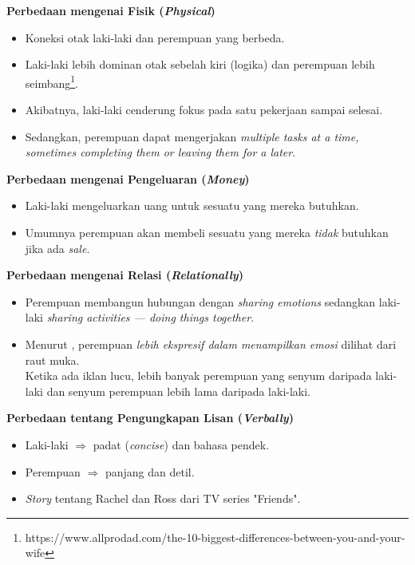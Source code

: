\documentclass{beamer}
\theoremstyle{mystyle}
\begin{document}
\begin{frame}{\textbf{Perbedaan mengenai Fisik (\textit{Physical})}}
	\begin{itemize}
		\item<2-> Koneksi otak laki-laki dan perempuan yang berbeda.
		\hfill \break
		\item<3-> Laki-laki lebih dominan otak sebelah kiri (logika) dan perempuan lebih seimbang\footnote{https://www.allprodad.com/the-10-biggest-differences-between-you-and-your-wife}.
		\hfill \break
		\item<4-> Akibatnya, laki-laki cenderung fokus pada satu pekerjaan sampai selesai.
		\hfill \break		
		\item<5-> Sedangkan, perempuan dapat mengerjakan \textit{multiple tasks at a time, sometimes completing them or leaving them for a later}.\\
		\hfill \break
	\end{itemize}
\end{frame}

\begin{frame}{\textbf{Perbedaan mengenai Pengeluaran (\textit{Money})}}
	\begin{itemize}
		\item Laki-laki mengeluarkan uang untuk sesuatu yang mereka butuhkan.
		\hfill \break
		\item<2-> Umumnya perempuan akan membeli sesuatu yang mereka \textit{tidak} butuhkan jika ada \textit{sale}.
	\end{itemize}
\end{frame}

\begin{frame}{\textbf{Perbedaan mengenai Relasi (\textit{Relationally})}}
	\begin{itemize}
		\item<2-> Perempuan membangun hubungan dengan \textit{sharing emotions} sedangkan laki-laki \textit{sharing activities --- doing things together}.
		\hfill \break
		\item<3-> Menurut \citet{mayemotional2017}, perempuan \textit{lebih ekspresif dalam menampilkan emosi} dilihat dari raut muka.\\
		Ketika ada iklan lucu, lebih banyak perempuan yang senyum daripada laki-laki dan senyum perempuan lebih lama daripada laki-laki.
	\end{itemize}
\end{frame}

\begin{frame}{\textbf{Perbedaan tentang Pengungkapan Lisan (\textit{Verbally})}}
	\begin{itemize}
		\item<1-> Laki-laki $\Longrightarrow$ padat (\textit{concise}) dan bahasa pendek.
		\hfill \break
		\item<2-> Perempuan $\Longrightarrow$ panjang dan detil.
		\hfill \break
		\item<3-> \textit{Story} tentang Rachel dan Ross dari TV series "Friends".
	\end{itemize}
\end{frame}
\end{document}
